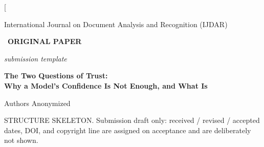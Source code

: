\documentclass[10pt,twocolumn,a4paper]{article}
\begin{document}
\twocolumn[{%
\vspace*{-0.4cm}
{\footnotesize International Journal on Document Analysis and Recognition (IJDAR)\\
\par}
\vspace{6pt}
\noindent\colorbox{gray!30}{\strut\ \footnotesize\bfseries ORIGINAL PAPER\ }%
\hfill{\footnotesize\color{gray}\itshape submission template}
\vspace{14pt}

{\noindent\LARGE\bfseries The Two Questions of Trust:\\[2pt]
Why a Model's Confidence Is Not Enough, and What Is\par}
\vspace{12pt}

{\noindent\large Authors Anonymized\par}
\vspace{4pt}
{\noindent\footnotesize\color{gray}STRUCTURE SKELETON. Submission draft only:
received / revised / accepted dates, DOI, and copyright line are assigned on
acceptance and are deliberately not shown.\par}
\vspace{16pt}

}
\end{document}
